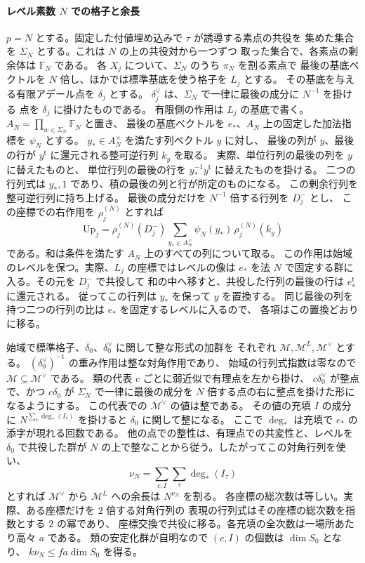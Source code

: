 \paragraph{レベル素数 \(N\) での格子と余長}
\(p=N\) とする。固定した付値埋め込みで \(\tau\) が誘導する素点の共役を
集めた集合を \(\Sigma_N\) とする。これは \(N\) の上の共役対から一つずつ
取った集合で、各素点の剰余体は \(\mathbb F_N\) である。
各 \(X_j\) について、\(\Sigma_N\) のうち \(\pi_N\) を割る素点で
最後の基底ベクトルを \(N\) 倍し、ほかでは標準基底を使う格子を \(L_j\) とする。
その基底を与える有限アデール点を \(\delta_j\) とする。
\(\delta_j^\vee\) は、\(\Sigma_N\) で一律に最後の成分に \(N^{-1}\) を掛ける
点を \(\delta_j\) に掛けたものである。
有限側の作用は \(L_j\) の基底で書く。\(A_N=\prod_{w\in\Sigma_N}\mathbb F_N\) と置き、
最後の基底ベクトルを \(e_*\)、\(A_N\) 上の固定した加法指標を \(\psi_N\) とする。
\(y_*\in A_N^\times\) を満たす列ベクトル \(y\) に対し、
最後の列が \(y\)、最後の行が \(y^{\mathsf t}\) に還元される整可逆行列 \(k_y\) を取る。
実際、単位行列の最後の列を \(y\) に替えたものと、
単位行列の最後の行を \(y_*^{-1}y^{\mathsf t}\) に替えたものを掛ける。
二つの行列式は \(y_*,1\) であり、積の最後の列と行が所定のものになる。
この剰余行列を整可逆行列に持ち上げる。
最後の成分だけを \(N^{-1}\) 倍する行列を \(D_j^-\) とし、
この座標での右作用を \(\rho_j^{(N)}\) とすれば
\[
 \mathrm{Up}_j=\rho_j^{(N)}(D_j^-)
     \sum_{y_* \in A_N^\times}\psi_N(y_*)\,\rho_j^{(N)}(k_y)
\]
である。和は条件を満たす \(A_N\) 上のすべての列について取る。
この作用は始域のレベルを保つ。実際、\(L_j\) の座標ではレベルの像は
\(e_*\) を法 \(N\) で固定する群に入る。その元を \(D_j^-\) で共役して
和の中へ移すと、共役した行列の最後の行は \(e_*^{\mathsf t}\) に還元される。
従ってこの行列は \(y_*\) を保って \(y\) を置換する。
同じ最後の列を持つ二つの行列の比は \(e_*\) を固定するレベルに入るので、
各項はこの置換どおりに移る。

始域で標準格子、\(\delta_0\)、\(\delta_0^\vee\) に関して整な形式の加群を
それぞれ \(\mathscr M,\mathscr M^L,\mathscr M^\vee\) とする。
\((\delta_0^\vee)^{-1}\) の重み作用は整な対角作用であり、
始域の行列式指数は零なので \(\mathscr M\subseteq\mathscr M^\vee\) である。
類の代表 \(c\) ごとに弱近似で有理点を左から掛け、
\(c\delta_0^\vee\) が整点で、かつ \(c\delta_0\) が
\(\Sigma_N\) で一律に最後の成分を \(N\) 倍する点の右に整点を掛けた形になるようにする。
この代表での \(\mathscr M^\vee\) の値は整である。
その値の充填 \(I\) の成分に
\(N^{\sum_\tau \deg_*(I_\tau)}\) を掛けると \(\delta_0\) に関して整になる。
ここで \(\deg_*\) は充填で \(e_*\) の添字が現れる回数である。
他の点での整性は、有理点での共変性と、レベルを \(\delta_0\) で共役した群が
\(N\) の上で整なことから従う。したがってこの対角行列を使い、
\[
 \nu_N=\sum_{c,I}\sum_\tau\deg_*(I_\tau)
\]
とすれば \(\mathscr M^\vee\) から \(\mathscr M^L\) への余長は \(N^{\nu_N}\) を割る。
各座標の総次数は等しい。実際、ある座標だけを \(2\) 倍する対角行列の
表現の行列式はその座標の総次数を指数とする \(2\) の冪であり、
座標交換で共役に移る。各充填の全次数は一場所あたり高々 \(a\) である。
類の安定化群が自明なので \((c,I)\) の個数は \(\dim S_0\) となり、
\(k\nu_N\le fa\dim S_0\) を得る。

